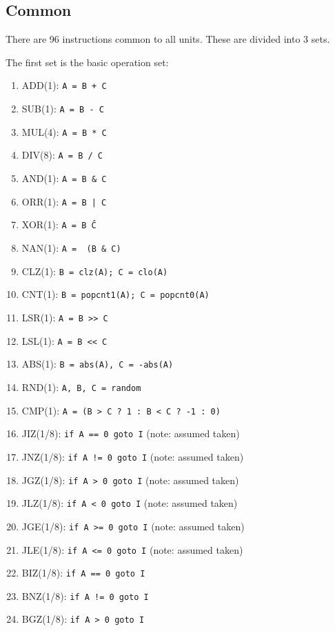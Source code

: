 \documentclass{article}
\begin{document}
\subsection*{Common}

There are 96 instructions common to all units. These are divided into 3 sets.

The first set is the basic operation set:

\begin{enumerate}[noitemsep]
    \item ADD(1): \texttt{A = B + C}
    \item SUB(1): \texttt{A = B - C}
    \item MUL(4): \texttt{A = B * C}
    \item DIV(8): \texttt{A = B / C}
    \item AND(1): \texttt{A = B \& C}
    \item ORR(1): \texttt{A = B | C}
    \item XOR(1): \texttt{A = B \^ C}
    \item NAN(1): \texttt{A = ~(B \& C)}
    \item CLZ(1): \texttt{B = clz(A); C = clo(A)}
    \item CNT(1): \texttt{B = popcnt1(A); C = popcnt0(A)}
    \item LSR(1): \texttt{A = B >> C}
    \item LSL(1): \texttt{A = B << C}
    \item ABS(1): \texttt{B = abs(A), C = -abs(A)}
    \item RND(1): \texttt{A, B, C = random}
    \item CMP(1): \texttt{A = (B > C ? 1 : B < C ? -1 : 0)}
    \item JIZ(1/8): \texttt{if A == 0 goto I} (note: assumed taken)
    \item JNZ(1/8): \texttt{if A != 0 goto I} (note: assumed taken)
    \item JGZ(1/8): \texttt{if A > 0 goto I} (note: assumed taken)
    \item JLZ(1/8): \texttt{if A < 0 goto I} (note: assumed taken)
    \item JGE(1/8): \texttt{if A >= 0 goto I} (note: assumed taken)
    \item JLE(1/8): \texttt{if A <= 0 goto I} (note: assumed taken)
    \item BIZ(1/8): \texttt{if A == 0 goto I}
    \item BNZ(1/8): \texttt{if A != 0 goto I}
    \item BGZ(1/8): \texttt{if A > 0 goto I}

\end{enumerate}
\end{document}
